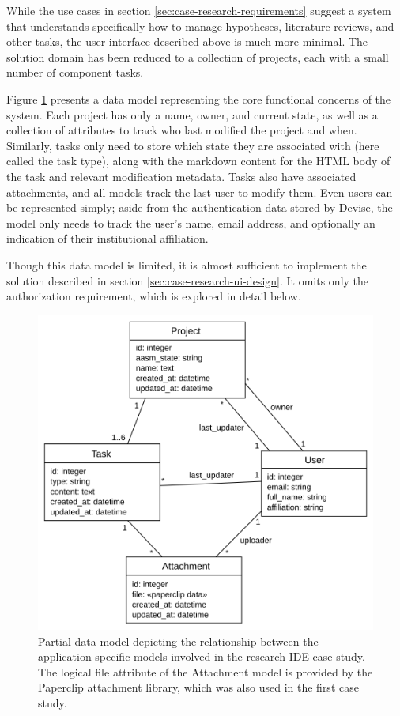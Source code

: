\documentclass[document.tex]{subfiles}
\begin{document}
While the use cases in section \ref{sec:case-research-requirements} suggest a system that understands specifically how to manage hypotheses, literature reviews, and other tasks, the user interface described above is much more minimal. The solution domain has been reduced to a collection of projects, each with a small number of component tasks.

Figure \ref{fig:case-research-data-model} presents a data model representing the core functional concerns of the system. Each project has only a name, owner, and current state, as well as a collection of attributes to track who last modified the project and when. Similarly, tasks only need to store which state they are associated with (here called the task type), along with the markdown content for the HTML body of the task and relevant modification metadata. Tasks also have associated attachments, and all models track the last user to modify them. Even users can be represented simply; aside from the authentication data stored by Devise, the model only needs to track the user's name, email address, and optionally an indication of their institutional affiliation.

Though this data model is limited, it is almost sufficient to implement the solution described in section \ref{sec:case-research-ui-design}. It omits only the authorization requirement, which is explored in detail below.

\begin{figure}[!ht]
\centering \includegraphics[width=5.0in]{./img/case-study-research-railgun/data-model}
\caption{Partial data model depicting the relationship between the application-specific models involved in the research IDE case study. The logical file attribute of the Attachment model is provided by the Paperclip attachment library, which was also used in the first case study.}
\label{fig:case-research-data-model}
\end{figure}
\end{document}
